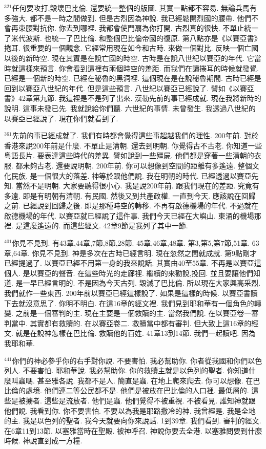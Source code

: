 \documentclass{book}
\begin{document}
$^{321}$任何要攻打,毀壞巴比倫.
還要統一整個的版圖.
其實一點都不容易.
無論兵馬有多強大.
都不是一時之間做到.
但是古烈因為神說.
我已經鬆開烈國的腰帶.
他們不會再束腰對抗你.
你去到哪裡.
我都會使門扇為你打開.
古烈真的很快.
不單止統一了米代波斯.
也統一了巴比倫.
和整個巴比倫帝國的復原.
第八點亦是《以賽亞書》捲耳.
很重要的一個觀念.
它經常用現在如今和古時.
來做一個對比.
反映一個亡國以後的新時空.
現在其實是在說亡國的時空.
古時是在說八世紀以賽亞的年代.
它當時就這樣來預言.
你會看到這裡有兩個時空的差距.
而我們在讀捲耳的時候就發覺.
已經是一個新的時空.
已經在秘魯的黑洞裡.
這個現在是在說秘魯期間.
古時已經是回到以賽亞八世紀的年代.
但是這些預言.
八世紀以賽亞已經說了.
譬如《以賽亞書》42章第九節.
我這裡是不是列了出來.
漢勒先前的事已經成就.
現在我將新時的說明.
這事未發已先.
我就說給你們聽.
六世紀的事情.
未曾發生.
我透過八世紀的以賽亞已經說了.
現在你們就看到了.

$^{361}$先前的事已經成就了.
我們有時都會覺得這些事超越我們的理性.
200年前.
對於香港來說200年前是什麼.
不單止是清朝.
還去到明朝.
你覺得古不古老.
你知道一些粵語長片.
要表達這些時代的差異.
譬如說到一些殭屍.
他們都是穿著一些清朝的衣服.
都未夠古老.
還要說明朝.
200年前.
你可以想像到空間的距離有多遙遠.
整個文化民族.
是一個很大的落差.
神等於跟他們說.
我在明朝的時代.
已經透過以賽亞先知.
當然不是明朝.
大家要聽得很小心.
我是說200年前.
跟我們現在的差距.
究竟有多遠.
即是有明朝有清朝.
有民國.
然後又到共產政權.
一直到今天.
應該說在回歸之前.
已經說到回歸之後.
即是那種時空的轉移.
不再有啟德機場的年代.
不過就在啟德機場的年代.
以賽亞就已經說了這件事.
我們今天已經在大嶼山.
東涌的機場那裡.
是這麼遙遠的.
而這些經文.
42章9節是我列了其中一節.

$^{401}$你見不見到.
有43章,44章,7節,8節,28節.
45章,46章,48章.
第3,第5,第7節,51章.
63章,64章.
你見不見到.
神是多次在古時已經言明.
現在忽然之間就成就.
第9點剛才已經提過了.
以賽亞已經不用第一身的我來說話.
其實由40至55章.
不再是以賽亞這個人.
是以賽亞的聲音.
在這些時光的走廊裡.
繼續的來勸說,挽回.
並且要讓他們知道.
是一早已經言明的.
不是因為今天古列.
毀滅了巴比倫.
所以現在大家興高采烈.
我們就作一些東西.
200年前以賽亞已經這樣說了.
如果是這樣的時候.
以賽亞書讀下去就沒意思了.
你明不明白.
在這16章的經文裡.
我們見到耶和華有一個角色的轉變.
之前是一個審判的主.
現在主要是一個救贖的主.
當然我們說.
在以賽亞卷一審判當中.
其實都有救贖的.
在以賽亞卷二.
救贖當中都有審判.
但大致上這16章的經文.
就是在說神怎樣在巴比倫.
救贖他的百姓.
41章13到14節.
我們一起讀吧.
因為我耶和華.

$^{441}$你們的神必參乎你的右手對你說.
不要害怕.
我必幫助你.
你者從我國和你們以色列人.
不要害怕.
耶和華說.
我必幫助你.
你的救贖主就是以色列的聖者.
你知道什麼叫蟲嗎.
甚至雅各說.
我都不是人.
簡直是蟲.
在地上爬來爬去.
你可以想像.
在巴比倫的處境.
他們連二等公民都不是.
他們是被放在巴比倫的人口裡.
最低層的.
這些是被擄者.
這些是流放者.
他們是蟲.
他們覺得不被重視.
不被看見.
誰知神就跟他們說.
我看到你.
你不要害怕.
不要以為我是耶路撒冷的神.
我曾經是.
我是全地的主.
我是以色列的聖者.
我今天就要向你來說話.
1到39章.
我們看到.
審判的經文.
在6章11到13節.
以塞雅當時在聖殿.
被神呼召.
神說你要去全港.
以塞雅問要到什麼時候.
神說直到成一方糧.
\end{document}
